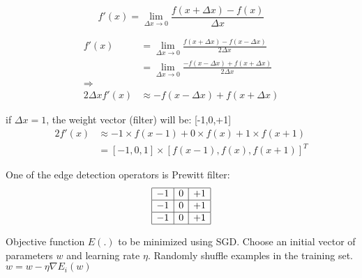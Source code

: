\documentclass{article}
\begin{document}
\centering
$$ f'(x)=\lim\limits_{\Delta x \to 0}\frac{f(x+\Delta x)-f(x)}{\Delta x}$$

\begin{align}
f'(x)&=\lim\limits_{\Delta x \to 0}\frac{f(x+\Delta x)-f(x-\Delta x)}{2\Delta x}\nonumber\\
&=\lim\limits_{\Delta x \to 0}\frac{-f(x-\Delta x)+f(x+\Delta x)}{2\Delta x}\nonumber\\
\Rightarrow\nonumber\\
2\Delta x f'(x) &\approx-f(x-\Delta x)+f(x+\Delta x)\nonumber
\end{align}


if $\Delta x=1$, the weight vector (filter) will be: [-1,0,+1]
\begin{align}
2f'(x) &\approx -1\times f(x-1) + 0\times f(x) +1\times f(x+1)\nonumber\\
&=[-1,0,1]\times[f(x-1),f(x),f(x+1)]^T\nonumber
\end{align}

\vspace{5mm}
One of the edge detection operators is Prewitt filter:
$$
\begin{array}{|c|c|c|}
\hline
	-1 & 0 & +1 \\
	\hline
	-1 & 0 & +1 \\
	\hline
	-1 & 0 & +1\\
	\hline
\end{array}
$$

\begin{algorithmic}[1]
\Require Objective function $E(.)$ to be minimized using SGD.
\State  Choose an initial vector of parameters $w$ and learning rate $\eta$.
\Repeat 
\State Randomly shuffle examples in the training set.
 \State $w = w - \eta \nabla E_i(w)$
\EndFor
{}
\end{algorithmic}
\end{document}
